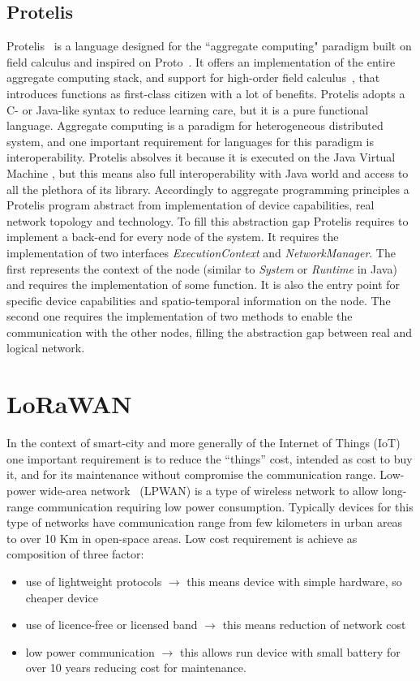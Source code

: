 \subsection{Protelis}
\label{subSec:Protelis}
Protelis~\cite{PianiniSAC2015} is a language designed for the ``aggregate computing" paradigm built on field calculus and inspired on Proto~\cite{Proto}. 
It offers an implementation of the entire aggregate computing stack, and support for high-order field calculus~\cite{Audrito2019}, that introduces functions as first-class citizen with a lot of benefits.
Protelis adopts a C- or Java-like syntax to reduce learning care, but it is a pure functional language.
Aggregate computing is a paradigm for heterogeneous distributed system, and one important requirement for languages for this paradigm is interoperability.
Protelis absolves it because it is executed on the Java Virtual Machine%
, but this means also full interoperability with Java world and access to all the plethora of its library.
Accordingly to aggregate programming principles a Protelis program abstract from implementation of device capabilities, real network topology and technology. 
To fill this abstraction gap Protelis requires to implement a back-end for every node of the system.
It requires the implementation of two interfaces \textit{ExecutionContext} and \textit{NetworkManager}. 
The first represents the context of the node (similar to \textit{System} or \textit{Runtime} in Java) and requires the implementation of some function. It is also the entry point for specific device capabilities and spatio-temporal information on the node. The second one requires the implementation of two methods to enable the communication with the other nodes, filling the abstraction gap between real and logical network.
\clearpage
\section{LoRaWAN}
\label{sec:LoRaWAN}

In the context of smart-city and more generally of the Internet of Things (IoT) one important requirement is to reduce the ``things'' cost, intended as cost to buy it, and for its maintenance without compromise the communication range.
Low-power wide-area network~\cite{Raza2017} (LPWAN) is a type of wireless network to allow long-range communication requiring low power consumption.
Typically devices for this type of networks have communication range from few kilometers in urban areas to over 10 Km in open-space areas.
Low cost requirement is achieve as composition of three factor:
\begin{itemize}
    \item use of lightweight protocols $\rightarrow$ this means device with simple hardware, so cheaper device
    \item use of licence-free or licensed band $\rightarrow$ this means reduction of network cost
    \item low power communication $\rightarrow$ this allows run device with small battery for over 10 years reducing cost for maintenance.
\end{itemize}

